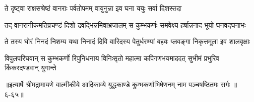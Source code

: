 \twolineshloka
{ते दृष्ट्वा राक्षसश्रेष्ठं वानराः पर्वतोपमम्}
{वायुनुन्ना इव घना ययुः सर्वा दिशस्तदा} %

\twolineshloka
{तद् वानरानीकमतिप्रचण्डं दिशो द्रवद्भिन्नमिवाभ्रजालम्}
{स कुम्भकर्णः समवेक्ष्य हर्षान्ननाद भूयो घनवद्घनाभः} %

\twolineshloka
{ते तस्य घोरं निनदं निशम्य यथा निनादं दिवि वारिदस्य}
{पेतुर्धरण्यां बहवः प्लवङ्गा निकृत्तमूला इव शालवृक्षाः} %

\twolineshloka
{विपुलपरिघवान् स कुम्भकर्णो रिपुनिधनाय विनिःसृतो महात्मा}
{कपिगणभयमाददत् सुभीमं प्रभुरिव किंकरदण्डवान् युगान्ते} %


॥इत्यार्षे श्रीमद्रामायणे वाल्मीकीये आदिकाव्ये युद्धकाण्डे कुम्भकर्णाभिषेणनम् नाम पञ्चषष्ठितमः सर्गः ॥६-६५॥
